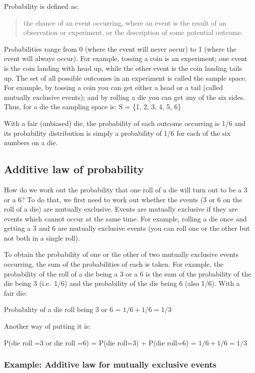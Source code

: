 \documentclass[
  a4paper,
]{memoir}
\begin{document}
Probability is defined as:

\begin{quote}
the chance of an event occurring, where an event is the result of an
observation or experiment, or the description of some potential outcome.
\end{quote}

Probabilities range from 0 (where the event will never occur) to 1
(where the event will always occur). For example, tossing a coin is an
experiment; one event is the coin landing with head up, while the other
event is the coin landing tails up. The set of all possible outcomes in
an experiment is called the sample space. For example, by tossing a coin
you can get either a head or a tail (called mutually exclusive events);
and by rolling a die you can get any of the six sides. Thus, for a die
the sampling space is: S = \{1, 2, 3, 4, 5, 6\}

With a fair (unbiased) die, the probability of each outcome occurring is
1/6 and its probability distribution is simply a probability of 1/6 for
each of the six numbers on a die.

\subsection{Additive law of
probability}\label{additive-law-of-probability}

How do we work out the probability that one roll of a die will turn out
to be a 3 or a 6? To do that, we first need to work out whether the
events (3 or 6 on the roll of a die) are mutually exclusive. Events are
mutually exclusive if they are events which cannot occur at the same
time. For example, rolling a die once and getting a 3 and 6 are mutually
exclusive events (you can roll one or the other but not both in a single
roll).

To obtain the probability of one or the other of two mutually exclusive
events occurring, the sum of the probabilities of each is taken. For
example, the probability of the roll of a die being a 3 or a 6 is the
sum of the probability of the die being 3 (i.e.~1/6) and the probability
of the die being 6 (also 1/6). With a fair die:

Probability of a die roll being 3 or 6 = \(1/6 + 1/6 = 1/3\)

Another way of putting it is:

P(die roll =3 or die roll =6) = P(die roll=3) + P(die roll=6) =
\(1/6 + 1/6 = 1/3\)

\subsubsection*{Example: Additive law for mutually exclusive
events}\label{example-additive-law-for-mutually-exclusive-events}
\end{document}
